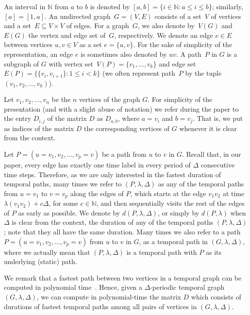 \documentclass[a4paper,UKenglish,cleveref, autoref, thm-restate]{lipics-v2021}
\begin{document}
An interval in $\mathbb N$ from $a$ to $b$ is denoted by $[a,b] = \{ i\in \mathbb N  :  a \leq i \leq b\}$; similarly, $[a] = [1,a]$.
An undirected graph~$G=(V,E)$ consists of a set~$V$ of vertices 
and a set~$E \subseteq V \times V$ of edges.
For a graph~$G$, we also denote by~$V(G)$ and~$E(G)$ the vertex and edge set of~$G$, respectively.
We denote an edge $e \in E$ between vertices $u,v \in V$ as a set $e=\{u,v\}$.
For the sake of simplicity of the representation, an edge $e$ is sometimes also denoted by $uv$. 
A path~$P$ in $G$ is a subgraph of $G$ with vertex set~$V(P)=\{v_1,\dots,v_k\}$ and edge set~$E(P)=\{\{v_i,v_{i+1}\} :  1\leq i<k\}$
(we often represent path~$P$ by the tuple~$(v_1,v_2,\dots,v_k)$).

Let $v_1,v_2,\ldots,v_n$ be the $n$ vertices of the graph $G$. 
For simplicity of the presentation (and with a slight abuse of notation) we refer during the paper to the entry $D_{i,j}$ of the matrix $D$ as $D_{a,b}$, where $a=v_i$ and $b=v_j$. 
That is, we put as indices of the matrix $D$ the corresponding vertices of $G$ whenever it is clear from the context. 


Let $P=(u=v_1, v_2, \dots, v_p=v)$ be a path from $u$ to $v$ in $G$. 
Recall that, in our paper, every edge has exactly one time label in every period of $\Delta$ consecutive time steps. 
Therefore, as we are only interested in the fastest duration of temporal paths, 
many times we refer to $(P,\lambda,\Delta)$ as any of the temporal paths from $u=v_1$ to $v=v_p$ along the edges of $P$, which starts at the edge $v_1 v_2$ at time $\lambda(v_1 v_2) + c \Delta$, for some $c\in \mathbb{N}$, and then sequentially visits the rest of the edges of $P$ as early as possible. 
We denote by $d(P,\lambda,\Delta)$, or simply by $d(P,\lambda)$ when $\Delta$ is clear from the context, the duration of any of the temporal paths $(P,\lambda,\Delta)$; note that they all have the same duration. 
Many times we also refer to a path $P=(u=v_1, v_2, \dots, v_p=v)$ from $u$ to $v$ in $G$,
as a temporal path in $(G,\lambda,\Delta)$,
where we actually mean that $(P,\lambda,\Delta)$ is a temporal path with $P$ as its underlying (static) path.


We remark that a fastest path between two vertices in a temporal graph can be computed in polynomial time~\cite{xuan_computing_2003,Wu2016Efficient}.
Hence, given a $\Delta$-periodic temporal graph $(G,\lambda,\Delta)$, we can compute in polynomial-time  the matrix $D$
which consists of durations of fastest temporal paths among all pairs of vertices in $(G,\lambda,\Delta)$.
\end{document}
